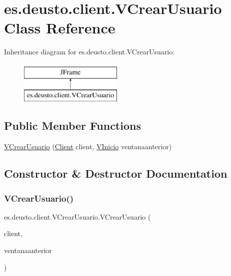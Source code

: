 \hypertarget{classes_1_1deusto_1_1client_1_1_v_crear_usuario}{}\section{es.\+deusto.\+client.\+V\+Crear\+Usuario Class Reference}
\label{classes_1_1deusto_1_1client_1_1_v_crear_usuario}
Inheritance diagram for es.\+deusto.\+client.\+V\+Crear\+Usuario\+:\begin{figure}[H]
\begin{center}
\leavevmode
\includegraphics[height=2.000000cm]{classes_1_1deusto_1_1client_1_1_v_crear_usuario}
\end{center}
\end{figure}
\subsection*{Public Member Functions}
\begin{DoxyCompactItemize}
\item 
\mbox{\hyperlink{classes_1_1deusto_1_1client_1_1_v_crear_usuario_a4594421f53a7f5da2faed5821e6392db}{V\+Crear\+Usuario}} (\mbox{\hyperlink{classes_1_1deusto_1_1client_1_1_client}{Client}} client, \mbox{\hyperlink{classes_1_1deusto_1_1client_1_1_v_inicio}{V\+Inicio}} ventanaanterior)
\end{DoxyCompactItemize}


\subsection{Constructor \& Destructor Documentation}
\mbox{\label{classes_1_1deusto_1_1client_1_1_v_crear_usuario_a4594421f53a7f5da2faed5821e6392db}} 
\subsubsection{\texorpdfstring{VCrearUsuario()}{VCrearUsuario()}}
{\footnotesize\ttfamily es.\+deusto.\+client.\+V\+Crear\+Usuario.\+V\+Crear\+Usuario (\begin{DoxyParamCaption}\item[{\mbox{\hyperlink{classes_1_1deusto_1_1client_1_1_client}{Client}}}]{client,  }\item[{\mbox{\hyperlink{classes_1_1deusto_1_1client_1_1_v_inicio}{V\+Inicio}}}]{ventanaanterior }\end{DoxyParamCaption})}

